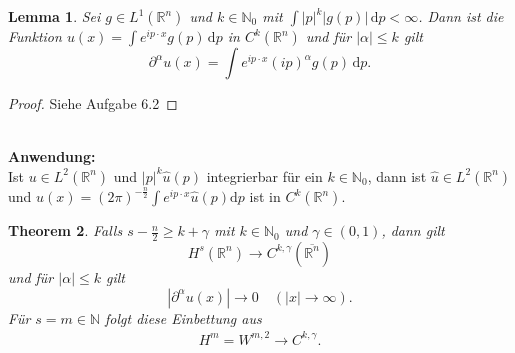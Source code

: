 \documentclass[
paper=a4,
bibtotocnumbered,
liststotocnumbered,
tablecaptionabove,
pointlessnumbers,
twoside,
openright,
10pt
]
{report}
\newtheorem{thm}{Theorem}[chapter]
\newtheorem{lem}[thm]{Lemma}
\theoremstyle{definition}
\numberwithin{equation}{chapter}
\begin{document}
\begin{lem}\label{lem 6.4}
Sei $g\in L^1(\mathbb R^n)$ und $k\in \mathbb N_0$ mit $\int |p|^k |g(p)|\, \mathrm dp < \infty$. Dann ist die Funktion $u(x) = \int e^{ip\cdot x} g(p) \, \mathrm dp$ in $C^k(\mathbb R^n)$ und für $|\alpha|\le k$ gilt
\begin{equation}
\partial^\alpha u(x) = \int e^{ip\cdot x} (ip)^\alpha g(p) \, \mathrm dp.
\end{equation}
\end{lem}
\begin{proof}
Siehe Aufgabe 6.2
\end{proof}
\ 
\\
\textbf{Anwendung:} 
\\Ist $u \in L^2(\mathbb{R}^n)$ und $|p|^k\widehat{u}(p)$ integrierbar für ein $k\in \mathbb{N}_0$, dann ist $\widehat{u} \in L^2(\mathbb{R}^n)$ und $u(x) = (2\pi)^{-\frac{n}{2}}\int e^{ip \cdot x} \widehat{u}(p) \mathrm{d}p$ ist in $C^k(\mathbb{R}^n).$
\begin{thm}\label{thm 6.5}
Falls $s- \frac{n}{2}\ge k +\gamma$ mit $k\in \mathbb N_0$ und $\gamma \in (0,1)$, dann gilt
\begin{equation}
H^s(\mathbb R^n) \to C^{k,\gamma}(\overline{\mathbb R^n})
\end{equation}
und für $|\alpha|\le k$ gilt
\begin{equation}
|\partial^\alpha u(x)|\to 0 \quad (|x|\to \infty).
\end{equation}
Für $s = m \in \mathbb{N}$ folgt diese Einbettung aus
\begin{align*}
H^m = W^{m,2} \rightarrow C^{k,\gamma}.
\end{align*}
\end{thm}
\end{document}
